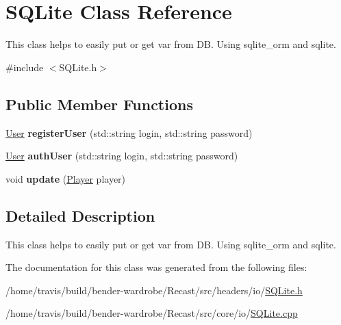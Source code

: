 \hypertarget{class_s_q_lite}{\section{S\-Q\-Lite Class Reference}
\label{class_s_q_lite}
}


This class helps to easily put or get var from D\-B. Using sqlite\-\_\-orm and sqlite.  




{\ttfamily \#include $<$S\-Q\-Lite.\-h$>$}

\subsection*{Public Member Functions}
\begin{DoxyCompactItemize}
\item 
\hypertarget{class_s_q_lite_a0603da23858970214de63b0cbef55bcc}{\hyperlink{struct_user}{User} {\bfseries register\-User} (std\-::string login, std\-::string password)}\label{class_s_q_lite_a0603da23858970214de63b0cbef55bcc}

\item 
\hypertarget{class_s_q_lite_a008a18ecfbb8d3db1127d25d147cdb8b}{\hyperlink{struct_user}{User} {\bfseries auth\-User} (std\-::string login, std\-::string password)}\label{class_s_q_lite_a008a18ecfbb8d3db1127d25d147cdb8b}

\item 
\hypertarget{class_s_q_lite_ad56342e900bc68110c8166c03bac229f}{void {\bfseries update} (\hyperlink{struct_player}{Player} player)}\label{class_s_q_lite_ad56342e900bc68110c8166c03bac229f}

\end{DoxyCompactItemize}


\subsection{Detailed Description}
This class helps to easily put or get var from D\-B. Using sqlite\-\_\-orm and sqlite. 

The documentation for this class was generated from the following files\-:\begin{DoxyCompactItemize}
\item 
/home/travis/build/bender-\/wardrobe/\-Recast/src/headers/io/\hyperlink{_s_q_lite_8h}{S\-Q\-Lite.\-h}\item 
/home/travis/build/bender-\/wardrobe/\-Recast/src/core/io/\hyperlink{_s_q_lite_8cpp}{S\-Q\-Lite.\-cpp}\end{DoxyCompactItemize}
